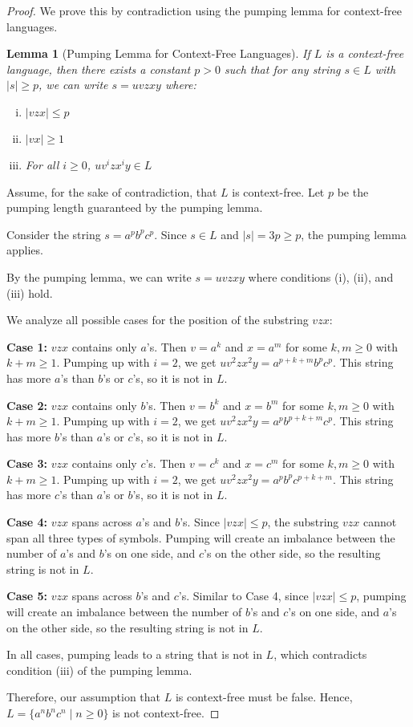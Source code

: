 \documentclass[12pt]{article}
\newtheorem{lemma}{Lemma}
\begin{document}
\begin{proof}
We prove this by contradiction using the pumping lemma for context-free languages.

\begin{lemma}[Pumping Lemma for Context-Free Languages]
If $L$ is a context-free language, then there exists a constant $p > 0$ such that for any string $s \in L$ with $|s| \geq p$, we can write $s = uvzxy$ where:
\begin{enumerate}[(i)]
\item $|vzx| \leq p$
\item $|vx| \geq 1$
\item For all $i \geq 0$, $uv^i zx^i y \in L$
\end{enumerate}
\end{lemma}

Assume, for the sake of contradiction, that $L$ is context-free. Let $p$ be the pumping length guaranteed by the pumping lemma.

Consider the string $s = a^p b^p c^p$. Since $s \in L$ and $|s| = 3p \geq p$, the pumping lemma applies.

By the pumping lemma, we can write $s = uvzxy$ where conditions (i), (ii), and (iii) hold.

We analyze all possible cases for the position of the substring $vzx$:

\textbf{Case 1:} $vzx$ contains only $a$'s.
Then $v = a^k$ and $x = a^m$ for some $k, m \geq 0$ with $k + m \geq 1$.
Pumping up with $i = 2$, we get $uv^2 zx^2 y = a^{p+k+m} b^p c^p$.
This string has more $a$'s than $b$'s or $c$'s, so it is not in $L$.

\textbf{Case 2:} $vzx$ contains only $b$'s.
Then $v = b^k$ and $x = b^m$ for some $k, m \geq 0$ with $k + m \geq 1$.
Pumping up with $i = 2$, we get $uv^2 zx^2 y = a^p b^{p+k+m} c^p$.
This string has more $b$'s than $a$'s or $c$'s, so it is not in $L$.

\textbf{Case 3:} $vzx$ contains only $c$'s.
Then $v = c^k$ and $x = c^m$ for some $k, m \geq 0$ with $k + m \geq 1$.
Pumping up with $i = 2$, we get $uv^2 zx^2 y = a^p b^p c^{p+k+m}$.
This string has more $c$'s than $a$'s or $b$'s, so it is not in $L$.

\textbf{Case 4:} $vzx$ spans across $a$'s and $b$'s.
Since $|vzx| \leq p$, the substring $vzx$ cannot span all three types of symbols.
Pumping will create an imbalance between the number of $a$'s and $b$'s on one side, and $c$'s on the other side, so the resulting string is not in $L$.

\textbf{Case 5:} $vzx$ spans across $b$'s and $c$'s.
Similar to Case 4, since $|vzx| \leq p$, pumping will create an imbalance between the number of $b$'s and $c$'s on one side, and $a$'s on the other side, so the resulting string is not in $L$.

In all cases, pumping leads to a string that is not in $L$, which contradicts condition (iii) of the pumping lemma.

Therefore, our assumption that $L$ is context-free must be false. Hence, $L = \{a^n b^n c^n \mid n \geq 0\}$ is not context-free.
\end{proof}
\end{document}
